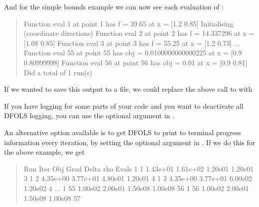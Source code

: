 \documentclass[letterpaper,10pt,english]{sphinxmanual}
\begin{document}
\sphinxAtStartPar
And for the simple bounds example we can now see each evaluation of :
\begin{quote}

\begin{sphinxVerbatim}[commandchars=\\\{\}]
Function eval 1 at point 1 has f = 39.65 at x = [\PYGZhy{}1.2   0.85]
Initialising (coordinate directions)
Function eval 2 at point 2 has f = 14.337296 at x = [\PYGZhy{}1.08  0.85]
Function eval 3 at point 3 has f = 55.25 at x = [\PYGZhy{}1.2   0.73]
...
Function eval 55 at point 55 has obj = 0.0100000000000225 at x = [0.9        0.80999998]
Function eval 56 at point 56 has obj = 0.01 at x = [0.9  0.81]
Did a total of 1 run(s)
\end{sphinxVerbatim}
\end{quote}

\sphinxAtStartPar
If we wanted to save this output to a file, we could replace the above call to  with
\begin{quote}

\begin{sphinxVerbatim}[commandchars=\\\{\}]
 
                     
\end{sphinxVerbatim}
\end{quote}

\sphinxAtStartPar
If you have logging for some parts of your code and you want to deactivate all DFO\sphinxhyphen{}LS logging, you can use the optional argument  in .

\sphinxAtStartPar
An alternative option available is to get DFO\sphinxhyphen{}LS to print to terminal progress information every iteration, by setting the optional argument  in . If we do this for the above example, we get
\begin{quote}

\begin{sphinxVerbatim}[commandchars=\\\{\}]
 Run  Iter     Obj       Grad     Delta      rho     Evals
  1     1    1.43e+01  1.61e+02  1.20e\PYGZhy{}01  1.20e\PYGZhy{}01    3
  1     2    4.35e+00  3.77e+01  4.80e\PYGZhy{}01  1.20e\PYGZhy{}01    4
  1     3    4.35e+00  3.77e+01  6.00e\PYGZhy{}02  1.20e\PYGZhy{}02    4
...
  1    55    1.00e\PYGZhy{}02  2.00e\PYGZhy{}01  1.50e\PYGZhy{}08  1.00e\PYGZhy{}08   56
  1    56    1.00e\PYGZhy{}02  2.00e\PYGZhy{}01  1.50e\PYGZhy{}08  1.00e\PYGZhy{}08   57
\end{sphinxVerbatim}
\end{quote}
\end{document}

